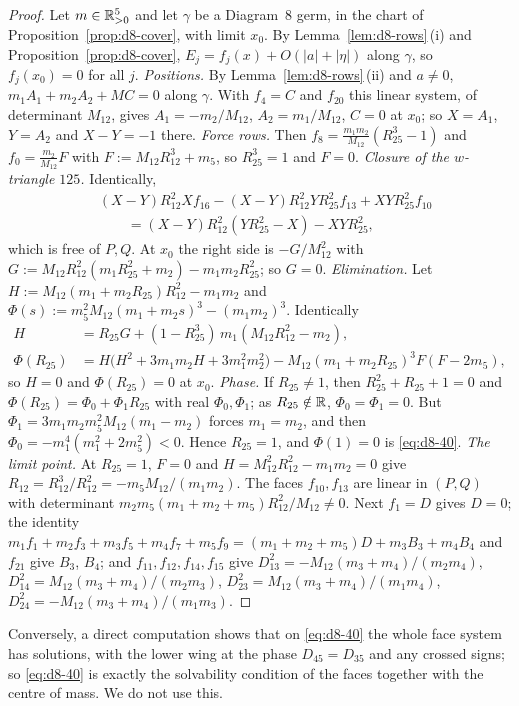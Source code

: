 \begin{proof}
Let $m\in\mathbb{R}_{>0}^5$ and let $\gamma$ be a Diagram~8 germ, in the chart of
Proposition~\ref{prop:d8-cover}, with limit $x_0$.
By Lemma~\ref{lem:d8-rows}\,(i) and Proposition~\ref{prop:d8-cover},
$E_j=f_j(x)+O(|a|+|\eta|)$ along $\gamma$, so $f_j(x_0)=0$ for all $j$.
\emph{Positions.}  By Lemma~\ref{lem:d8-rows}\,(ii) and $a\ne0$, $m_1A_1+m_2A_2+MC=0$ along
$\gamma$.  With $f_4=C$ and $f_{20}$ this linear system, of determinant $M_{12}$, gives
$A_1=-m_2/M_{12}$, $A_2=m_1/M_{12}$, $C=0$ at $x_0$; so $X=A_1$, $Y=A_2$ and $X-Y=-1$ there.
\emph{Force rows.}  Then $f_8=\frac{m_1m_2}{M_{12}}(R_{25}^3-1)$ and $f_0=\frac{m_2}{M_{12}}F$
with $F:=M_{12}R_{12}^3+m_5$, so $R_{25}^3=1$ and $F=0$.
\emph{Closure of the $w$-triangle $125$.}  Identically,
\begin{align*}
  &(X-Y)R_{12}^2Xf_{16}-(X-Y)R_{12}^2YR_{25}^2f_{13}+XYR_{25}^2f_{10}\\
  &\qquad=(X-Y)R_{12}^2(YR_{25}^2-X)-XYR_{25}^2,
\end{align*}
which is free of $P,Q$.  At $x_0$ the right side is $-G/M_{12}^2$ with
$G:=M_{12}R_{12}^2(m_1R_{25}^2+m_2)-m_1m_2R_{25}^2$; so $G=0$.
\emph{Elimination.}  Let $H:=M_{12}(m_1+m_2R_{25})R_{12}^2-m_1m_2$ and
$\Phi(s):=m_5^2M_{12}(m_1+m_2s)^3-(m_1m_2)^3$.  Identically
\begin{align*}
  H&=R_{25}G+(1-R_{25}^3)\,m_1(M_{12}R_{12}^2-m_2),\\
  \Phi(R_{25})&=H\bigl(H^2+3m_1m_2H+3m_1^2m_2^2\bigr)
  -M_{12}(m_1+m_2R_{25})^3F(F-2m_5),
\end{align*}
so $H=0$ and $\Phi(R_{25})=0$ at $x_0$.
\emph{Phase.}  If $R_{25}\ne1$, then $R_{25}^2+R_{25}+1=0$ and $\Phi(R_{25})=\Phi_0+\Phi_1R_{25}$
with real $\Phi_0,\Phi_1$; as $R_{25}\notin\mathbb{R}$, $\Phi_0=\Phi_1=0$.  But
$\Phi_1=3m_1m_2m_5^2M_{12}(m_1-m_2)$ forces $m_1=m_2$, and then $\Phi_0=-m_1^4(m_1^2+2m_5^2)<0$.
Hence $R_{25}=1$, and $\Phi(1)=0$ is \eqref{eq:d8-40}.
\emph{The limit point.}  At $R_{25}=1$, $F=0$ and $H=M_{12}^2R_{12}^2-m_1m_2=0$ give
$R_{12}=R_{12}^3/R_{12}^2=-m_5M_{12}/(m_1m_2)$.  The faces $f_{10},f_{13}$ are linear in $(P,Q)$
with determinant $m_2m_5(m_1+m_2+m_5)R_{12}^2/M_{12}\ne0$.  Next $f_1=D$ gives $D=0$; the
identity $m_1f_1+m_2f_3+m_3f_5+m_4f_7+m_5f_9=(m_1+m_2+m_5)D+m_3B_3+m_4B_4$ and $f_{21}$ give
$B_3$, $B_4$; and $f_{11},f_{12},f_{14},f_{15}$ give
$D_{13}^2=-M_{12}(m_3+m_4)/(m_2m_4)$, $D_{14}^2=M_{12}(m_3+m_4)/(m_2m_3)$,
$D_{23}^2=M_{12}(m_3+m_4)/(m_1m_4)$, $D_{24}^2=-M_{12}(m_3+m_4)/(m_1m_3)$.
\end{proof}
Conversely, a direct computation shows that on \eqref{eq:d8-40} the whole face system has
solutions, with the lower wing at the phase $D_{45}=D_{35}$ and any crossed signs; so
\eqref{eq:d8-40} is exactly the solvability condition of the faces together with the centre of
mass.  We do not use this.

